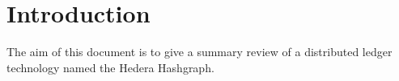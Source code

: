 \section{Introduction}
The aim of this document is to give a summary review of a distributed ledger technology named the Hedera Hashgraph.
